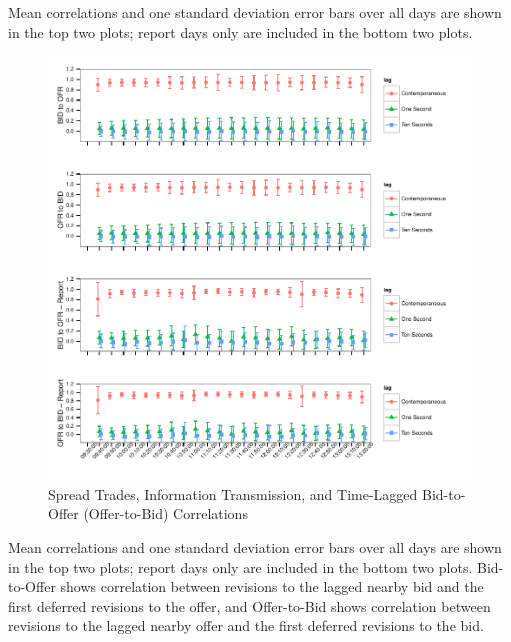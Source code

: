 \documentclass[10pt,review]{elsarticle}
\begin{document}
Mean correlations and one standard deviation error bars over all days
are shown in the top two plots; report days only are included in the
bottom two plots.

\clearpage

\begin{figure}[htbp]
\centering
\includegraphics{TablesFigures_files/figure-latex/unnamed-chunk-6-1.pdf}
\caption{Spread Trades, Information Transmission, and Time-Lagged
Bid-to-Offer (Offer-to-Bid) Correlations}
\end{figure}

Mean correlations and one standard deviation error bars over all days
are shown in the top two plots; report days only are included in the
bottom two plots. Bid-to-Offer shows correlation between revisions to
the lagged nearby bid and the first deferred revisions to the offer, and
Offer-to-Bid shows correlation between revisions to the lagged nearby
offer and the first deferred revisions to the bid.
\end{document}
